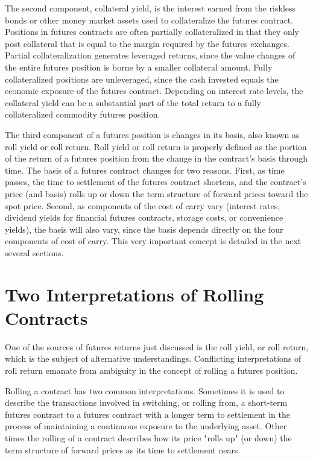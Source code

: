 \documentclass[11pt]{article}
\begin{document}
The second component, collateral yield, is the interest earned from the riskless bonds or other money market assets used to collateralize the futures contract. Positions in futures contracts are often partially collateralized in that they only post collateral that is equal to the margin required by the futures exchanges. Partial collateralization generates leveraged returns, since the value changes of the entire futures position is borne by a smaller collateral amount. Fully collateralized positions are unleveraged, since the cash invested equals the economic exposure of the futures contract. Depending on interest rate levels, the collateral yield can be a substantial part of the total return to a fully collateralized commodity futures position.

The third component of a futures position is changes in its basis, also known as roll yield or roll return. Roll yield or roll return is properly defined as the portion of the return of a futures position from the change in the contract's basis through time. The basis of a futures contract changes for two reasons. First, as time passes, the time to settlement of the futures contract shortens, and the contract's price (and basis) rolls up or down the term structure of forward prices toward the spot price. Second, as components of the cost of carry vary (interest rates, dividend yields for financial futures contracts, storage costs, or convenience yields), the basis will also vary, since the basis depends directly on the four components of cost of carry. This very important concept is detailed in the next several sections.

\section*{Two Interpretations of Rolling Contracts}
One of the sources of futures returns just discussed is the roll yield, or roll return, which is the subject of alternative understandings. Conflicting interpretations of roll return emanate from ambiguity in the concept of rolling a futures position.

Rolling a contract has two common interpretations. Sometimes it is used to describe the transactions involved in switching, or rolling from, a short-term futures contract to a futures contract with a longer term to settlement in the process of maintaining a continuous exposure to the underlying asset. Other times the rolling of a contract describes how its price "rolls up" (or down) the term structure of forward prices as its time to settlement nears.
\end{document}
